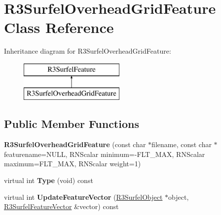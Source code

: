 \hypertarget{class_r3_surfel_overhead_grid_feature}{}\section{R3\+Surfel\+Overhead\+Grid\+Feature Class Reference}
\label{class_r3_surfel_overhead_grid_feature}
Inheritance diagram for R3\+Surfel\+Overhead\+Grid\+Feature\+:\begin{figure}[H]
\begin{center}
\leavevmode
\includegraphics[height=2.000000cm]{class_r3_surfel_overhead_grid_feature}
\end{center}
\end{figure}
\subsection*{Public Member Functions}
\begin{DoxyCompactItemize}
\item 
{\bfseries R3\+Surfel\+Overhead\+Grid\+Feature} (const char $\ast$filename, const char $\ast$featurename=N\+U\+LL, R\+N\+Scalar minimum=-\/F\+L\+T\+\_\+\+M\+AX, R\+N\+Scalar maximum=F\+L\+T\+\_\+\+M\+AX, R\+N\+Scalar weight=1)\hypertarget{class_r3_surfel_overhead_grid_feature_aaf904ba9ea4bed70566fcbe90c908ba1}{}\label{class_r3_surfel_overhead_grid_feature_aaf904ba9ea4bed70566fcbe90c908ba1}

\item 
virtual int {\bfseries Type} (void) const \hypertarget{class_r3_surfel_overhead_grid_feature_a5dfd394aed57529fb2b29868b78e9d51}{}\label{class_r3_surfel_overhead_grid_feature_a5dfd394aed57529fb2b29868b78e9d51}

\item 
virtual int {\bfseries Update\+Feature\+Vector} (\hyperlink{class_r3_surfel_object}{R3\+Surfel\+Object} $\ast$object, \hyperlink{class_r3_surfel_feature_vector}{R3\+Surfel\+Feature\+Vector} \&vector) const \hypertarget{class_r3_surfel_overhead_grid_feature_a87c86ea368ff6c2ecb7587779573d45d}{}\label{class_r3_surfel_overhead_grid_feature_a87c86ea368ff6c2ecb7587779573d45d}

\end{DoxyCompactItemize}
